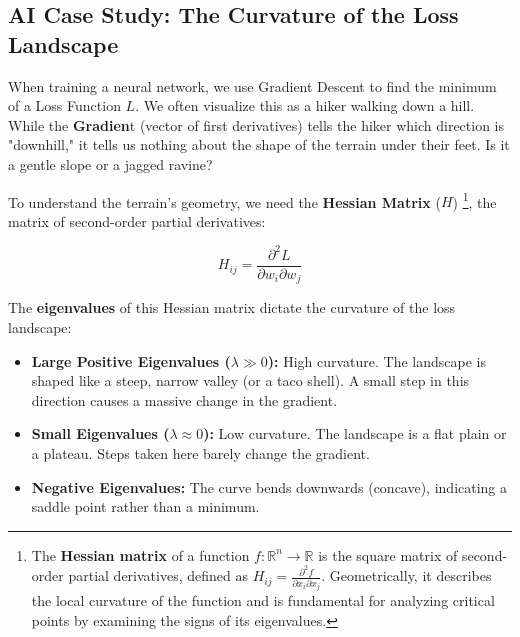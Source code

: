 \subsection{AI Case Study: The Curvature of the Loss Landscape}

When training a neural network, we use Gradient Descent to find the minimum of a Loss Function $L$. We often visualize this as a hiker walking down a hill.
While the \textbf{Gradien}t (vector of first derivatives) tells the hiker which direction is "downhill," it tells us nothing about the shape of the terrain under their feet. Is it a gentle slope or a jagged ravine?

To understand the terrain's geometry, we need the \textbf{Hessian Matrix} ($H$) \footnote{The \textbf{Hessian matrix} of a function $f: \mathbb{R}^n \to \mathbb{R}$ is the square matrix of second-order partial derivatives, defined as $H_{ij} = \frac{\partial^2 f}{\partial x_i \partial x_j}$. Geometrically, it describes the local curvature of the function and is fundamental for analyzing critical points by examining the signs of its eigenvalues.}, the matrix of second-order partial derivatives:

\[
H_{ij} = \frac{\partial^2 L}{\partial w_i \partial w_j}
\]

The \textbf{eigenvalues} of this Hessian matrix dictate the curvature of the loss landscape:

\begin{itemize}
    \item \textbf{Large Positive Eigenvalues ($\lambda \gg 0$):} High curvature. The landscape is shaped like a steep, narrow valley (or a taco shell). A small step in this direction causes a massive change in the gradient.
    \item \textbf{Small Eigenvalues ($\lambda \approx 0$):} Low curvature. The landscape is a flat plain or a plateau. Steps taken here barely change the gradient.
    \item \textbf{Negative Eigenvalues:} The curve bends downwards (concave), indicating a saddle point rather than a minimum.
\end{itemize}


